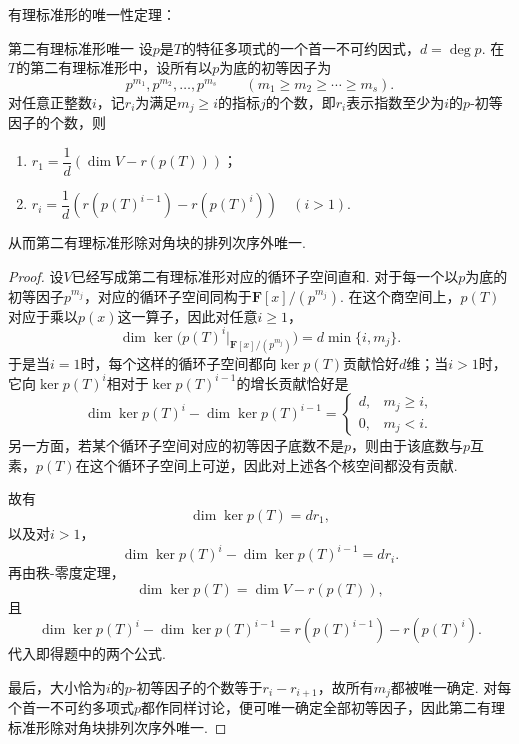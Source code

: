 有理标准形的唯一性定理：
\begin{theorem}{}{第二有理标准形唯一}
    设$p$是$T$的特征多项式的一个首一不可约因式，$d=\deg p$. 在$T$的第二有理标准形中，设所有以$p$为底的初等因子为
    \[
        p^{m_1},p^{m_2},\ldots,p^{m_s}\qquad (m_1\geqslant m_2\geqslant\cdots\geqslant m_s).
    \]
    对任意正整数$i$，记$r_i$为满足$m_j\geqslant i$的指标$j$的个数，即$r_i$表示指数至少为$i$的$p$-初等因子的个数，则
    \begin{enumerate}
        \item $r_1=\dfrac{1}{d}(\dim V-r(p(T)))$；
        \item $r_i=\dfrac{1}{d}(r(p(T)^{i-1})-r(p(T)^i))\quad (i>1)$.
    \end{enumerate}
    从而第二有理标准形除对角块的排列次序外唯一.
\end{theorem}
\begin{proof}
    设$V$已经写成第二有理标准形对应的循环子空间直和. 对于每一个以$p$为底的初等因子$p^{m_j}$，对应的循环子空间同构于$\mathbf{F}[x]/(p^{m_j})$. 在这个商空间上，$p(T)$对应于乘以$p(x)$这一算子，因此对任意$i\geqslant 1$，
    \[
        \dim\ker\bigl(p(T)^i\vert_{\mathbf{F}[x]/(p^{m_j})}\bigr)=d\min\{i,m_j\}.
    \]
    于是当$i=1$时，每个这样的循环子空间都向$\ker p(T)$贡献恰好$d$维；当$i>1$时，它向$\ker p(T)^i$相对于$\ker p(T)^{i-1}$的增长贡献恰好是
    \[
        \dim\ker p(T)^i-\dim\ker p(T)^{i-1}=
        \begin{cases}
            d, & m_j\geqslant i, \\
            0, & m_j<i.
        \end{cases}
    \]
    另一方面，若某个循环子空间对应的初等因子底数不是$p$，则由于该底数与$p$互素，$p(T)$在这个循环子空间上可逆，因此对上述各个核空间都没有贡献.

    故有
    \[
        \dim\ker p(T)=dr_1,
    \]
    以及对$i>1$，
    \[
        \dim\ker p(T)^i-\dim\ker p(T)^{i-1}=dr_i.
    \]
    再由秩-零度定理，
    \[
        \dim\ker p(T)=\dim V-r(p(T)),
    \]
    且
    \[
        \dim\ker p(T)^i-\dim\ker p(T)^{i-1}=r(p(T)^{i-1})-r(p(T)^i).
    \]
    代入即得题中的两个公式.

    最后，大小恰为$i$的$p$-初等因子的个数等于$r_i-r_{i+1}$，故所有$m_j$都被唯一确定. 对每个首一不可约多项式$p$都作同样讨论，便可唯一确定全部初等因子，因此第二有理标准形除对角块排列次序外唯一.
\end{proof}

